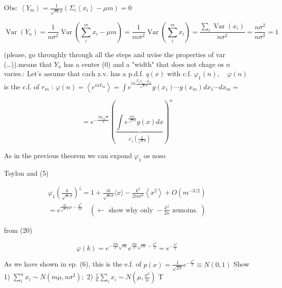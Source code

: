 Obs: $\left\langle Y_{m}\right\rangle=\frac{1}{\sqrt{m} \sigma}\left(\Sigma_{i}\left\langle x_{i}\right\rangle-\mu m\right)=0$

$$ 
\operatorname{Var}\left(Y_{n}\right)=\frac{1}{n \sigma^{2}} \operatorname{Var}\left(\sum_{i}^{m} x_{i}-\mu m\right)=\frac{1}{m \sigma^{2}} \operatorname{Var}\left(\sum_{i}^{m} x_{i}\right)=\frac{\sum_{i} \operatorname{Var}\left(x_{i}\right)}{n \sigma^{2}}=\frac{n \sigma^{2}}{n \sigma^{2}}=1
$$ 

(please, go throughly through all the steps and uvise the properties of var (…)).\nThis means that $Y_{n}$ has a center (0) and a "width" that does not chage os $n$ varies.\nproof:
Let's assume that cach z.v. has a p.d.f. $q(x)$ with c.f. $\varphi_{1}(n), \quad \varphi(n)$ is the c.f. of $r_{m}$ :
$\varphi(n)=\left\langle e^{i n V_{m}}\right\rangle=\int e^{i n \frac{\Sigma_{i} x_{i}-\mu_{m}}{\sqrt{\pi} \sigma}} g\left(x_{1}\right) \cdots g\left(x_{m}\right) d x_{1} \cdots d x_{m}=$

\begin{equation*}
=e^{-\frac{i k \mu \sqrt{n}}{\sigma}}(\underbrace{\int e^{\frac{i n x}{\sqrt{n} \sigma}} g(x) d x}_{\varphi_{1}\left(\frac{k}{\sqrt{n} \sigma}\right)})^{n} \tag{20}
\end{equation*}

As in the previous theorem we can expond $\varphi_{1}$ os noso

Toylon and (5)

$$ 
\begin{gathered}
\varphi_{1}\left(\frac{k}{\sqrt{n} \sigma}\right)^{\downarrow}=1+\frac{i k}{\sqrt{n} \sigma}\langle x\rangle-\frac{k^{2}}{2 m \sigma^{2}}\left\langle x^{2}\right\rangle+O\left(m^{-3 / 2}\right) \\
=e^{\frac{i k}{\sqrt{n}\sigma} \mu-\frac{k^{2}}{2n}} \quad(\leftarrow \text { show why only }-\frac{k^{2}}{2n} \text { zemoins. })
\end{gathered}
$$ 

from (20)

$$ 
\varphi(k)=e^{-\frac{i k \mu}{\sigma} \sqrt{m}} e^{\frac{i k \mu}{\sigma} \sqrt{m}-\frac{k^{2}}{2}}=e^{-\frac{k^{2}}{2}}
$$ 

As we have shown in ep. (6), this is the e.f. of $p(x)=\frac{1}{\sqrt{2 \pi}} e^{-\frac{x^{2}}{2}} \equiv N(0,1)$ Show 1) $\sum_{i}^{n} x_{i} \sim N
\left(m \mu, n \sigma^{2}\right) ;$ 2) $\frac{1}{n} \sum_{i} x_{i} \sim N
\left(\mu, \frac{\sigma^{2}}{n}\right)$ T